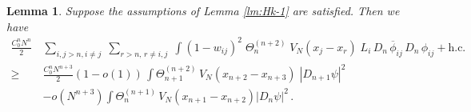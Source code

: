 \documentclass[11pt]{article}
\newtheorem{lemma}[theorem]{Lemma}
\begin{document}
\begin{lemma}\label{lm:Hk-1-2}
Suppose the assumptions of Lemma \ref{lm:Hk-1} are satisfied. Then
we have
\begin{equation}\label{eq:lmHk-1-2}
\begin{split}
\frac{C_0^n N^n}{2} \, &\sum_{i,j
> n, i\neq j} \; \sum_{r>n, \, r \neq i,j} \; \int (1-w_{ij})^2 \;
\Theta^{(n+2)}_n \; V_N (x_j -x_r) \; L_i \, D_n \,
\overline{\phi}_{ij}\, D_n \, \phi_{ij} + \text{h.c.}
\\ \geq \; &\frac{C_0^n N^{n+3}}{2} (1-o(1)) \,
\int \Theta^{(n+2)}_{n+1} \,
V_N (x_{n+2} -x_{n+3}) \; |D_{n+1} \psi|^2 \\
&- o(N^{n+3})\int \Theta^{(n+1)}_{n} \, V_N (x_{n+1} - x_{n+2}) |D_n
\psi|^2 \, .
\end{split}
\end{equation}
\end{lemma}
\end{document}
